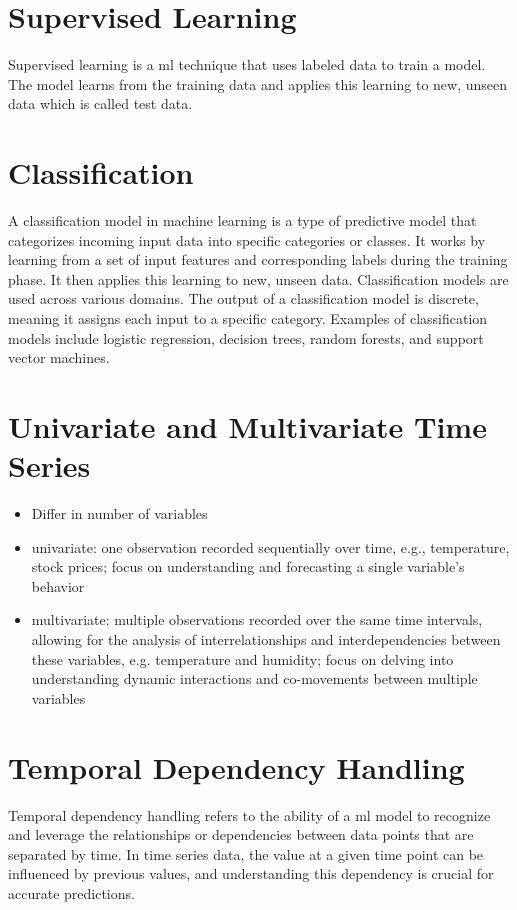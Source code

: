 \section{Supervised Learning}
Supervised learning is a \acs{ml} technique that uses labeled data to train a model.
The model learns from the training data and applies this learning to new, unseen data which is called test data.

\section{Classification}

A classification model in machine learning is a type of predictive model that categorizes incoming input data into specific categories or classes.
It works by learning from a set of input features and corresponding labels during the training phase.
It then applies this learning to new, unseen data.
Classification models are used across various domains.
The output of a classification model is discrete, meaning it assigns each input to a specific category.
Examples of classification models include logistic regression, decision trees, random forests, and support vector machines.

\section{Univariate and Multivariate Time Series}
\begin{itemize}
    \item Differ in number of variables
    \item univariate: one observation recorded sequentially over time, e.g., temperature, stock prices; focus on understanding and forecasting a single variable's behavior
    \item multivariate: multiple observations recorded over the same time intervals, allowing for the analysis of interrelationships and interdependencies between these variables, e.g. temperature and humidity; focus on delving into understanding dynamic interactions and co-movements between multiple variables
\end{itemize}

\section{Temporal Dependency Handling}
Temporal dependency handling refers to the ability of a \acs{ml} model to recognize and leverage the relationships or dependencies between data points that are separated by time. 
In time series data, the value at a given time point can be influenced by previous values, and understanding this dependency is crucial for accurate predictions.

